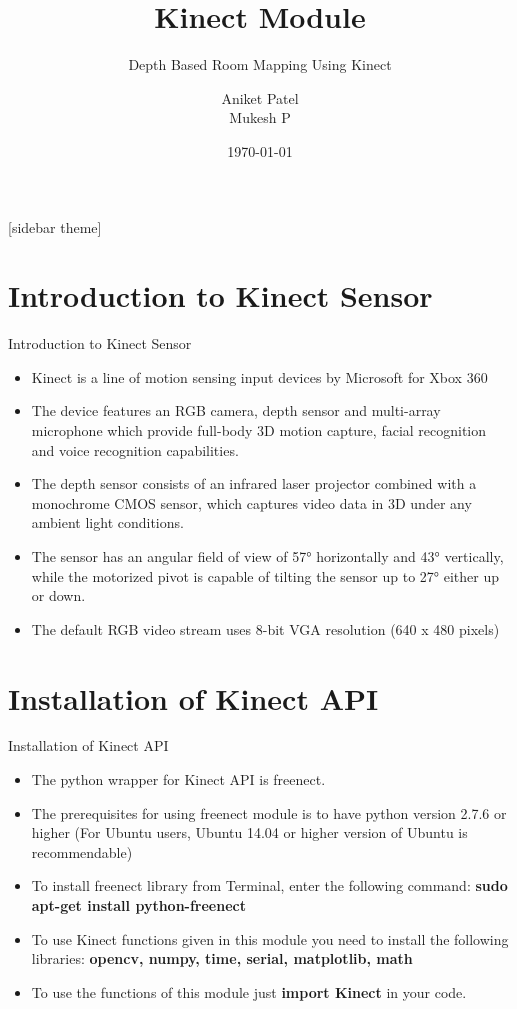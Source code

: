 \documentclass[10pt, a4paper]{beamer}
\begin{document}
	\title{Kinect Module}
	\subtitle{Depth Based Room Mapping Using Kinect}
	\author{Aniket Patel\\ Mukesh P}
	\date{\today}
	\frame{\titlepage}

[sidebar theme]

\section{Introduction to Kinect Sensor}
\begin{frame}{Introduction to Kinect Sensor}
 \begin{itemize}
  \item Kinect is a line of motion sensing input devices by Microsoft for Xbox 360
  \item The device features an RGB camera, depth sensor and multi-array microphone which provide full-body 3D motion capture, facial recognition and voice recognition capabilities.
  \item The depth sensor consists of an infrared laser projector combined with a monochrome CMOS sensor, which captures video data in 3D under any ambient light conditions.
  \item The sensor has an angular field of view of 57° horizontally and 43° vertically, while the motorized pivot is capable of tilting the sensor up to 27° either up or down.
  \item The default RGB video stream uses 8-bit VGA resolution (640 x 480 pixels)
 \end{itemize}
\end{frame}

\section{Installation of Kinect API}
\begin{frame}{Installation of Kinect API}
 \begin{itemize}
  \item The python wrapper for Kinect API is freenect.
  \item The prerequisites for using freenect module is to have python version 2.7.6 or higher (For Ubuntu users, Ubuntu 14.04 or higher version of Ubuntu is recommendable)
  \item To install freenect library from Terminal, enter the following command: \newline \textbf{sudo apt-get install python-freenect}
  \item To use Kinect functions given in this module you need to install the following libraries: \newline \textbf{opencv, numpy, time, serial, matplotlib, math}
  \item To use the functions of this module just \textbf{import Kinect} in your code.
 \end{itemize}

\end{frame}
\end{document}

